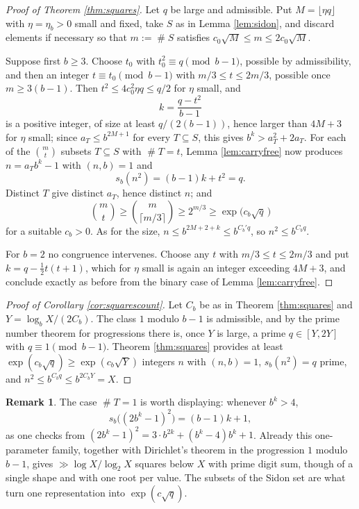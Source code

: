 \documentclass[11pt,reqno]{amsart}
\theoremstyle{plain}
\theoremstyle{definition}
\newtheorem{remark}[theorem]{Remark}
\DeclareMathOperator{\Card}{\#}
\begin{document}
\begin{proof}[Proof of Theorem \ref{thm:squares}]
Let $q$ be large and admissible. Put $M=\lfloor\eta q\rfloor$ with $\eta=\eta_b>0$ small and fixed, take $S$ as in Lemma \ref{lem:sidon}, and discard elements if necessary so that $m:=\Card S$ satisfies $c_0\sqrt M\le m\le2c_0\sqrt M$.

Suppose first $b\ge3$. Choose $t_0$ with $t_0^{2}\equiv q\pmod{b-1}$, possible by admissibility, and then an integer $t\equiv t_0\pmod{b-1}$ with $m/3\le t\le2m/3$, possible once $m\ge3(b-1)$. Then $t^{2}\le4c_0^{2}\eta q\le q/2$ for $\eta$ small, and
\[
k=\frac{q-t^{2}}{b-1}
\]
is a positive integer, of size at least $q/(2(b-1))$, hence larger than $4M+3$ for $\eta$ small; since $a_T\le b^{2M+1}$ for every $T\subseteq S$, this gives $b^{k}>a_T^{2}+2a_T$. For each of the $\binom mt$ subsets $T\subseteq S$ with $\Card T=t$, Lemma \ref{lem:carryfree} now produces $n=a_Tb^{k}-1$ with $(n,b)=1$ and
\[
s_b(n^{2})=(b-1)k+t^{2}=q .
\]
Distinct $T$ give distinct $a_T$, hence distinct $n$; and
\[
\binom mt\ge\binom m{\lceil m/3\rceil}\ge2^{m/3}\ge\exp\big(c_b\sqrt q\,\big)
\]
for a suitable $c_b>0$. As for the size, $n\le b^{2M+2+k}\le b^{C_b'q}$, so $n^{2}\le b^{C_bq}$.

For $b=2$ no congruence intervenes. Choose any $t$ with $m/3\le t\le2m/3$ and put $k=q-\tfrac12t(t+1)$, which for $\eta$ small is again an integer exceeding $4M+3$, and conclude exactly as before from the binary case of Lemma \ref{lem:carryfree}.
\end{proof}

\begin{proof}[Proof of Corollary \ref{cor:squarescount}]
Let $C_b$ be as in Theorem \ref{thm:squares} and $Y=\log_bX/(2C_b)$. The class $1$ modulo $b-1$ is admissible, and by the prime number theorem for progressions there is, once $Y$ is large, a prime $q\in[Y,2Y]$ with $q\equiv1\pmod{b-1}$. Theorem \ref{thm:squares} provides at least $\exp(c_b\sqrt q)\ge\exp(c_b\sqrt Y)$ integers $n$ with $(n,b)=1$, $s_b(n^{2})=q$ prime, and $n^{2}\le b^{C_bq}\le b^{2C_bY}=X$.
\end{proof}

\begin{remark}\label{rem:singleton}
The case $\Card T=1$ is worth displaying: whenever $b^{k}>4$,
\[
s_b\big((2b^{k}-1)^{2}\big)=(b-1)k+1,
\]
as one checks from $(2b^k-1)^2=3\cdot b^{2k}+(b^{k}-4)b^{k}+1$. Already this one-parameter family, together with Dirichlet's theorem in the progression $1$ modulo $b-1$, gives $\gg\log X/\log_2X$ squares below $X$ with prime digit sum, though of a single shape and with one root per value. The subsets of the Sidon set are what turn one representation into $\exp(c\sqrt q)$.
\end{remark}
\end{document}

